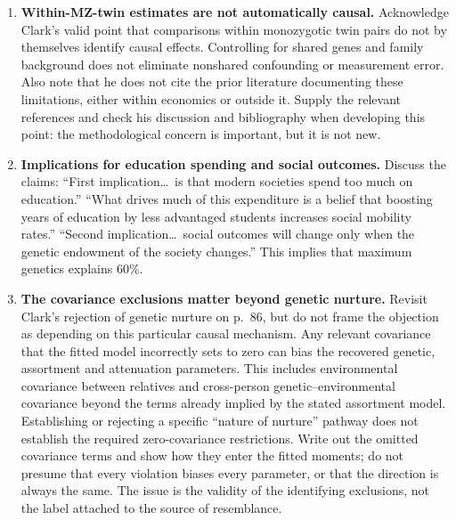 \documentclass[12pt]{article}
\renewenvironment{itemize}{\begin{enumerate}}{\end{enumerate}}
\begin{document}
\begin{itemize}
\item \textbf{Within-MZ-twin estimates are not automatically causal.}
Acknowledge Clark's valid point that comparisons within monozygotic
twin pairs do not by themselves identify causal effects. Controlling
for shared genes and family background does not eliminate nonshared
confounding or measurement error. Also note that he does not cite the
prior literature documenting these limitations, either within economics
or outside it. Supply the relevant references and check his discussion
and bibliography when developing this point: the methodological concern
is important, but it is not new.
\item \textbf{Implications for education spending and social outcomes.}
Discuss the claims: ``First implication\ldots\ is that modern societies
spend too much on education.'' ``What drives much of this expenditure
is a belief that boosting years of education by less advantaged students
increases social mobility rates.'' ``Second implication\ldots\ social
outcomes will change only when the genetic endowment of the society
changes.'' This implies that maximum genetics explains 60\%.
\item \textbf{The covariance exclusions matter beyond genetic nurture.}
Revisit Clark's rejection of genetic nurture on p.~86, but do not frame
the objection as depending on this particular causal mechanism. Any
relevant covariance that the fitted model incorrectly sets to zero can
bias the recovered genetic, assortment and attenuation parameters.
This includes environmental covariance between relatives and
cross-person genetic--environmental covariance beyond the terms already
implied by the stated assortment model. Establishing or rejecting a
specific ``nature of nurture'' pathway does not establish the required
zero-covariance restrictions. Write out the omitted covariance terms and
show how they enter the fitted moments; do not presume that every
violation biases every parameter, or that the direction is always the
same. The issue is the validity of the identifying exclusions, not the
label attached to the source of resemblance.


\end{itemize}
\end{document}
